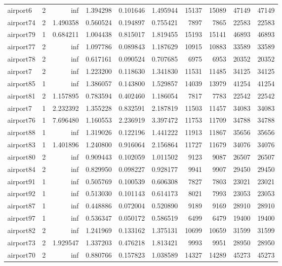 \begin{longtable}{|l|r|r|r|r|r|r|r|r|r|}
airport6 & 2 & inf & 1.394298 & 0.101646 & 1.495944 & 15137 & 15089 & 47149 & 47149 \\
airport74 & 2 & 1.490358 & 0.560524 & 0.194897 & 0.755421 & 7897 & 7865 & 22583 & 22583 \\
airport79 & 1 & 0.684211 & 1.004438 & 0.815017 & 1.819455 & 15193 & 15141 & 46893 & 46893 \\
airport77 & 2 & inf & 1.097786 & 0.089843 & 1.187629 & 10915 & 10883 & 33589 & 33589 \\
airport78 & 2 & inf & 0.617161 & 0.090524 & 0.707685 & 6975 & 6953 & 20352 & 20352 \\
airport7 & 2 & inf & 1.223200 & 0.118630 & 1.341830 & 11531 & 11485 & 34125 & 34125 \\
airport85 & 1 & inf & 1.386057 & 0.143800 & 1.529857 & 14039 & 13979 & 41254 & 41254 \\
airport81 & 2 & 1.157895 & 0.783594 & 0.402460 & 1.186054 & 7817 & 7783 & 22542 & 22542 \\
airport7 & 1 & 2.232392 & 1.355228 & 0.832591 & 2.187819 & 11503 & 11457 & 34083 & 34083 \\
airport76 & 1 & 7.696480 & 1.160553 & 2.236919 & 3.397472 & 11753 & 11709 & 34788 & 34788 \\
airport88 & 1 & inf & 1.319026 & 0.122196 & 1.441222 & 11913 & 11867 & 35656 & 35656 \\
airport83 & 1 & 1.401896 & 1.240800 & 0.916064 & 2.156864 & 11727 & 11679 & 34076 & 34076 \\
airport80 & 2 & inf & 0.909443 & 0.102059 & 1.011502 & 9123 & 9087 & 26507 & 26507 \\
airport84 & 2 & inf & 0.829950 & 0.098227 & 0.928177 & 9941 & 9907 & 29450 & 29450 \\
airport91 & 1 & inf & 0.505769 & 0.100539 & 0.606308 & 7827 & 7803 & 23021 & 23021 \\
airport92 & 1 & inf & 0.513030 & 0.101143 & 0.614173 & 8021 & 7993 & 23053 & 23053 \\
airport87 & 1 & inf & 0.448886 & 0.072004 & 0.520890 & 9189 & 9169 & 28910 & 28910 \\
airport97 & 1 & inf & 0.536347 & 0.050172 & 0.586519 & 6499 & 6479 & 19400 & 19400 \\
airport82 & 2 & inf & 1.241969 & 0.133162 & 1.375131 & 10699 & 10659 & 31599 & 31599 \\
airport73 & 2 & 1.929547 & 1.337203 & 0.476218 & 1.813421 & 9993 & 9951 & 28950 & 28950 \\
airport70 & 2 & inf & 0.880766 & 0.157823 & 1.038589 & 14327 & 14289 & 45273 & 45273 \\

\end{longtable}
